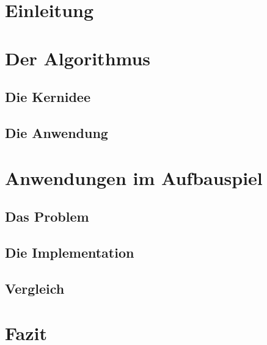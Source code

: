 \documentclass[12pt]{article}
\begin{document}
\tableofcontents

\section{Einleitung}

\section{Der Algorithmus}

\subsection{Die Kernidee}

\subsection{Die Anwendung}

\section{Anwendungen im Aufbauspiel}

\subsection{Das Problem}

\subsection{Die Implementation}

\subsection{Vergleich}

\section{Fazit}


\nocite{*}
\printbibliography
\end{document}
